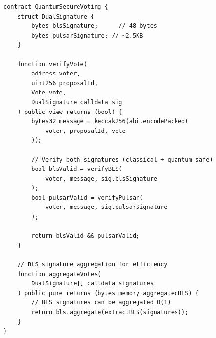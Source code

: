 \begin{lstlisting}[language=Solidity,caption=Quantum-secure vote verification]
contract QuantumSecureVoting {
    struct DualSignature {
        bytes blsSignature;      // 48 bytes
        bytes pulsarSignature; // ~2.5KB
    }

    function verifyVote(
        address voter,
        uint256 proposalId,
        Vote vote,
        DualSignature calldata sig
    ) public view returns (bool) {
        bytes32 message = keccak256(abi.encodePacked(
            voter, proposalId, vote
        ));

        // Verify both signatures (classical + quantum-safe)
        bool blsValid = verifyBLS(
            voter, message, sig.blsSignature
        );
        bool pulsarValid = verifyPulsar(
            voter, message, sig.pulsarSignature
        );

        return blsValid && pulsarValid;
    }

    // BLS signature aggregation for efficiency
    function aggregateVotes(
        DualSignature[] calldata signatures
    ) public pure returns (bytes memory aggregatedBLS) {
        // BLS signatures can be aggregated O(1)
        return bls.aggregate(extractBLS(signatures));
    }
}
\end{lstlisting}

